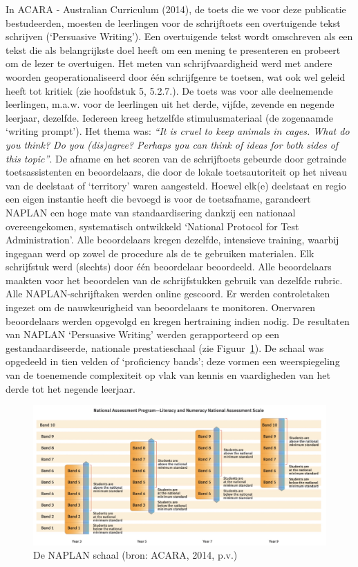 \documentclass[
  letterpaper,
]{report}
\begin{document}
In ACARA - Australian Curriculum (2014), de toets die we voor deze
publicatie bestudeerden, moesten de leerlingen voor de schrijftoets een
overtuigende tekst schrijven (`Persuasive Writing'). Een overtuigende
tekst wordt omschreven als een tekst die als belangrijkste doel heeft om
een mening te presenteren en probeert om de lezer te overtuigen. Het
meten van schrijfvaardigheid werd met andere woorden geoperationaliseerd
door één schrijfgenre te toetsen, wat ook wel geleid heeft tot kritiek
(zie hoofdstuk 5, 5.2.7.). De toets was voor alle deelnemende
leerlingen, m.a.w. voor de leerlingen uit het derde, vijfde, zevende en
negende leerjaar, dezelfde. Iedereen kreeg hetzelfde stimulusmateriaal
(de zogenaamde `writing prompt'). Het thema was: \emph{``It is cruel to
keep animals in cages. What do you think? Do you (dis)agree? Perhaps you
can think of ideas for both sides of this topic''}. De afname en het
scoren van de schrijftoets gebeurde door getrainde toetsassistenten en
beoordelaars, die door de lokale toetsautoriteit op het niveau van de
deelstaat of `territory' waren aangesteld. Hoewel elk(e) deelstaat en
regio een eigen instantie heeft die bevoegd is voor de toetsafname,
garandeert NAPLAN een hoge mate van standaardisering dankzij een
nationaal overeengekomen, systematisch ontwikkeld `National Protocol for
Test Administration'. Alle beoordelaars kregen dezelfde, intensieve
training, waarbij ingegaan werd op zowel de procedure als de te
gebruiken materialen. Elk schrijfstuk werd (slechts) door één
beoordelaar beoordeeld. Alle beoordelaars maakten voor het beoordelen
van de schrijfstukken gebruik van dezelfde rubric. Alle
NAPLAN-schrijftaken werden online gescoord. Er werden controletaken
ingezet om de nauwkeurigheid van beoordelaars te monitoren. Onervaren
beoordelaars werden opgevolgd en kregen hertraining indien nodig. De
resultaten van NAPLAN `Persuasive Writing' werden gerapporteerd op een
gestandaardiseerde, nationale prestatieschaal (zie
Figuur~\ref{fig-figuur4}). De schaal was opgedeeld in tien velden of
`proficiency bands'; deze vormen een weerspiegeling van de toenemende
complexiteit op vlak van kennis en vaardigheden van het derde tot het
negende leerjaar.

\begin{figure}

{\centering \includegraphics{./FIG4.jpg}

}

\caption{\label{fig-figuur4}De NAPLAN schaal (bron: ACARA, 2014, p.v.)}

\end{figure}
\end{document}
